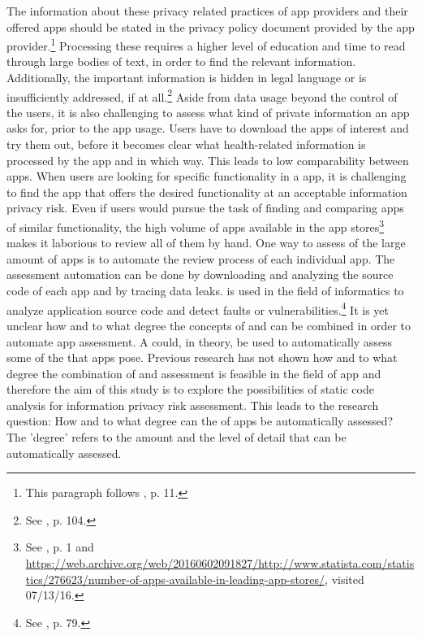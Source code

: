 The information about these privacy related practices of app providers and their offered apps should be stated in the privacy policy document provided by the app provider.\footnote{This paragraph follows \cite{Dehling2014}, p. 11.}
Processing these \pps requires a higher level of education and time to read through large bodies of text, in order to find the relevant information. 
Additionally, the important information is hidden in legal language or is  insufficiently addressed, if at all.\footnote{See \cite{Pollach2007}, p. 104.}
Aside from data usage beyond the control of the users, it is also challenging to assess what kind of private information an app asks for, prior to the app usage. 
Users have to download the apps of interest and try them out, before it becomes clear what health-related information is processed by the app and in which  way. 
This leads to low comparability between apps. 
When users are looking for specific functionality in a \mH app, it is challenging to find the app that offers the desired functionality at an acceptable information privacy risk. 
Even if users would pursue the task of finding and comparing \mH apps of similar functionality, the high volume of apps available in the app stores\footnote{See \cite{Enck2011}, p. 1 and \url{https://web.archive.org/web/20160602091827/http://www.statista.com/statistics/276623/number-of-apps-available-in-leading-app-stores/}, visited 07/13/16.} makes it laborious to review all of them by hand.
One way to assess \ipr of the large amount of \mH apps is to automate the review process of each individual app. 
The assessment automation can be done by downloading and analyzing the source code of each app and by tracing data leaks. 
\Sca is used in the field of informatics to analyze application source code and detect faults or vulnerabilities.\footnote{See \cite{Baca2008}, p. 79.} 
It is yet unclear how and to what degree the concepts of \sca and \pra can be combined in order to automate app assessment.
A \sca could, in theory, be used to automatically assess some of the \ipr that \mH apps pose.
Previous research has not shown how and to what degree the combination of \sca and \ipr assessment is feasible in the field of \mH app \pra and therefore the aim of this study is to explore the possibilities of static code analysis for information privacy risk assessment. 
This leads to the research question: How and to what degree can the \ipr of \mH apps be automatically assessed?
The 'degree' refers to the amount and the level of detail that \iprfs can be automatically assessed.

